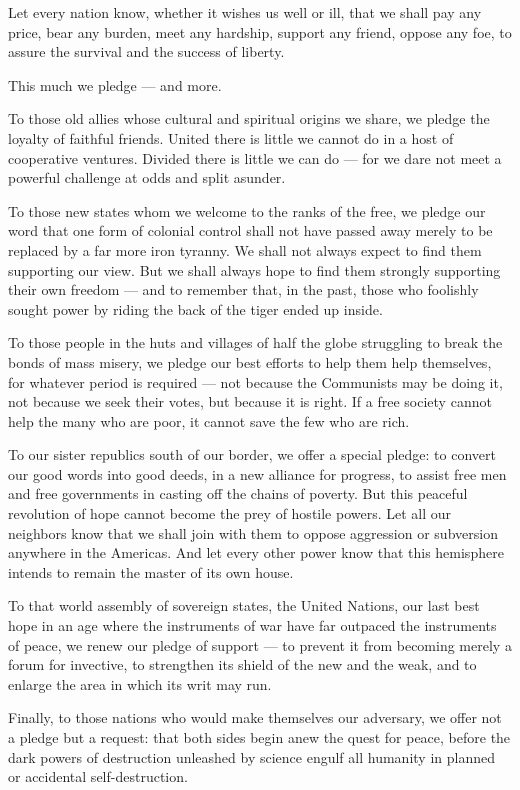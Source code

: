 \documentclass[a4paper]{amsbook}
\begin{document}
Let every nation know, whether it wishes us well or ill, that we shall pay any price, bear any burden, meet any hardship, support any friend, oppose any foe, to assure the survival and the success of liberty.

This much we pledge — and more.

To those old allies whose cultural and spiritual origins we share, we pledge the loyalty of faithful friends. United there is little we cannot do in a host of cooperative ventures. Divided there is little we can do — for we dare not meet a powerful challenge at odds and split asunder.

To those new states whom we welcome to the ranks of the free, we pledge our word that one form of colonial control shall not have passed away merely to be replaced by a far more iron tyranny. We shall not always expect to find them supporting our view. But we shall always hope to find them strongly supporting their own freedom — and to remember that, in the past, those who foolishly sought power by riding the back of the tiger ended up inside.

To those people in the huts and villages of half the globe struggling to break the bonds of mass misery, we pledge our best efforts to help them help themselves, for whatever period is required — not because the Communists may be doing it, not because we seek their votes, but because it is right. If a free society cannot help the many who are poor, it cannot save the few who are rich.

To our sister republics south of our border, we offer a special pledge: to convert our good words into good deeds, in a new alliance for progress, to assist free men and free governments in casting off the chains of poverty. But this peaceful revolution of hope cannot become the prey of hostile powers. Let all our neighbors know that we shall join with them to oppose aggression or subversion anywhere in the Americas. And let every other power know that this hemisphere intends to remain the master of its own house.

To that world assembly of sovereign states, the United Nations, our last best hope in an age where the instruments of war have far outpaced the instruments of peace, we renew our pledge of support — to prevent it from becoming merely a forum for invective, to strengthen its shield of the new and the weak, and to enlarge the area in which its writ may run.

Finally, to those nations who would make themselves our adversary, we offer not a pledge but a request: that both sides begin anew the quest for peace, before the dark powers of destruction unleashed by science engulf all humanity in planned or accidental self-destruction.
\end{document}
